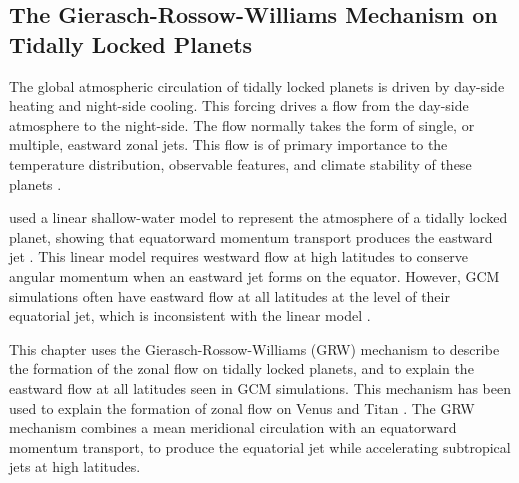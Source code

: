 \begin{SingleSpace}
\chapter{The Gierasch-Rossow-Williams Mechanism on Tidally Locked Planets}\label{ch:eqm-zonal-flow}
\end{SingleSpace}









The global atmospheric circulation of tidally locked planets is driven by day-side heating and night-side cooling. This forcing drives a flow from the day-side atmosphere to the night-side. The flow normally takes the form of single, or multiple, eastward zonal jets. This flow is of primary importance to the temperature distribution, observable features, and climate stability of these planets \citep{stevenson2014thermal,louden2015spatially,pierrehumbert2018review}.


 \citet{showman2011superrotation} used a linear shallow-water model to represent the atmosphere of a tidally locked planet, showing that equatorward momentum transport produces the eastward jet \citep{matsuno1966quasi}. This linear model requires westward flow at high latitudes to conserve angular momentum when an eastward jet forms on the equator. However, GCM simulations often have eastward flow at all latitudes at the level of their equatorial jet, which is inconsistent with the linear model \citep{showman2015circulation,kataria2015atmospheric,pierrehumbert2018review}.


This chapter uses the Gierasch-Rossow-Williams (GRW) mechanism to describe the formation of the zonal flow on tidally locked planets, and to explain the eastward flow at all latitudes seen in GCM simulations. This mechanism has been used to explain the formation of zonal flow on Venus and Titan \citep{gierasch1975meridional, rossow1979large, read2018superrotation}. The GRW mechanism combines a mean meridional circulation with an equatorward momentum transport, to produce the equatorial jet while accelerating subtropical jets at high latitudes.

